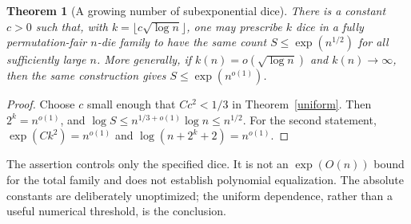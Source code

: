 \documentclass[11pt]{article}
\newtheorem{theorem}{Theorem}\newtheorem{lemma}{Lemma}
\begin{document}
\begin{theorem}[A growing number of subexponential dice]
There is a constant $c>0$ such that, with
$k=\lfloor c\sqrt{\log n}\rfloor$, one may prescribe $k$ dice in a
fully permutation-fair $n$-die family to have the same count
$S\le\exp(n^{1/2})$ for all sufficiently large $n$.
More generally, if $k(n)=o(\sqrt{\log n})$ and $k(n)\to\infty$,
then the same construction gives $S\le\exp(n^{o(1)})$.
\end{theorem}
\begin{proof}
Choose $c$ small enough that $Cc^2<1/3$ in Theorem~\ref{uniform}.
Then $2^k=n^{o(1)}$, and
$\log S\le n^{1/3+o(1)}\log n\le n^{1/2}$.
For the second statement, $\exp(Ck^2)=n^{o(1)}$ and
$\log(n+2^k+2)=n^{o(1)}$.
\end{proof}

The assertion controls only the specified dice. It is not an
$\exp(O(n))$ bound for the total family and does not establish
polynomial equalization. The absolute constants are deliberately
unoptimized; the uniform dependence, rather than a useful numerical
threshold, is the conclusion.
\end{document}
